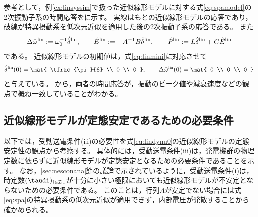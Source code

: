 \documentclass[tombow,dvipdfmx]{corona-a5-1.1}
\begin{document}


\begin{例}[近似線形モデルに対する低次元近似]
参考として，例\ref{ex:linsyssim}で扱った近似線形モデルに対する式\ref{eq:spamodel}の2次振動子系の時間応答をに示す。
実線はもとの近似線形モデルの応答であり，破線が特異摂動系を低次元近似を適用した後の2次振動子系の応答である。
また
\[
\Delta \hat{\omega}^{\rm lin}:=\omega_0^{-1} \dot{\hat{\delta}}^{\rm lin},\qquad
\hat{E}^{\rm lin}:=-A^{-1}B\hat{\delta}^{\rm lin},\qquad
\hat{P}^{\rm lin}:= L \hat{\delta}^{\rm lin} + C \hat{E}^{\rm lin}
\]
である。
近似線形モデルの初期値は，式\ref{eq:linmini}に対応させて
\[
\hat{\delta}^{\rm lin}(0)
 =
\mat{
\tfrac{\pi}{6} \\
0 \\
0
},\qquad
\Delta \hat{\omega}^{\rm lin}(0)
 =
\mat{
0 \\
0 \\
0
}
\]
と与えている。
から，両者の時間応答が，振動のピーク値や減衰速度などの観点で概ね一致していることがわかる。
\end{例}

\subsection{近似線形モデルが定態安定であるための必要条件\advanced}\label{sec:nesconsta}

以下では，受動送電条件(iii)の必要性を式\ref{eq:lindynu0}の近似線形モデルの定態安定性の観点から考察する。
具体的には，受動送電条件(iii)は，発電機群の物理定数に依らずに近似線形モデルが定態安定となるための必要条件であることを示す。
なお，\ref{sec:nesconana}節の議論で示されているように，受動送電条件(i)は，時定数$(\taudi)_{i \in \mathcal{I}_{\rm G}}$が十分に小さい極限においても近似線形モデルが不安定とならないための必要条件である。
このことは，行列$A$が安定でない場合には式\ref{eq:spa}の特異摂動系の低次元近似が適用できず，内部電圧が発散することから確かめられる。
\end{document}
